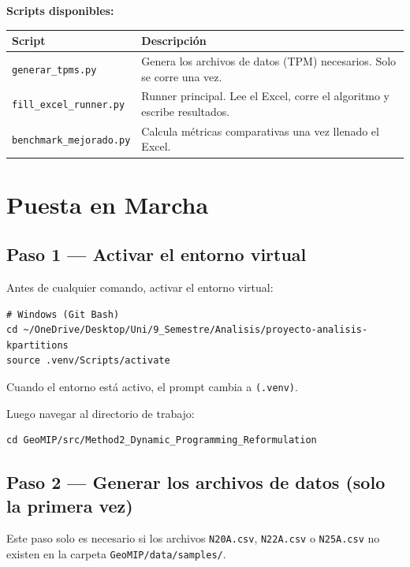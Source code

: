\documentclass[12pt,a4paper]{article}
\begin{document}
\textbf{Scripts disponibles:}
\begin{longtable}{lp{9cm}}
    \toprule
    Script & Descripción \\
    \midrule
    \endhead
    \texttt{generar\_tpms.py}     & Genera los archivos de datos (TPM) necesarios. Solo se corre una vez. \\
    \texttt{fill\_excel\_runner.py} & Runner principal. Lee el Excel, corre el algoritmo y escribe resultados. \\
    \texttt{benchmark\_mejorado.py} & Calcula métricas comparativas una vez llenado el Excel. \\
    \bottomrule
\end{longtable}

\section{Puesta en Marcha}

\subsection{Paso 1 — Activar el entorno virtual}

Antes de cualquier comando, activar el entorno virtual:

\begin{lstlisting}
# Windows (Git Bash)
cd ~/OneDrive/Desktop/Uni/9_Semestre/Analisis/proyecto-analisis-kpartitions
source .venv/Scripts/activate
\end{lstlisting}

Cuando el entorno está activo, el prompt cambia a \texttt{(.venv)}.

Luego navegar al directorio de trabajo:
\begin{lstlisting}
cd GeoMIP/src/Method2_Dynamic_Programming_Reformulation
\end{lstlisting}

\subsection{Paso 2 — Generar los archivos de datos (solo la primera vez)}

\begin{notebox}
Este paso solo es necesario si los archivos \texttt{N20A.csv}, \texttt{N22A.csv} o \texttt{N25A.csv} no existen en la carpeta \texttt{GeoMIP/data/samples/}.
\end{notebox}
\end{document}
